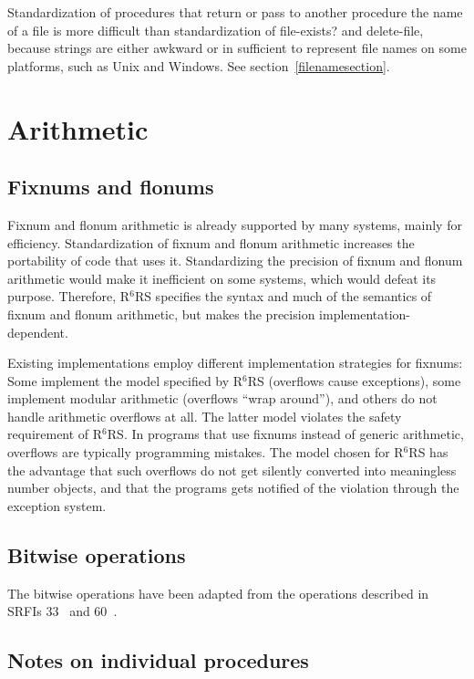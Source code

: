 \documentclass[twoside,twocolumn]{algol60}
\newcommand{\rn}[1]{R$^{#1}$RS}
\begin{document}
Standardization of procedures that return or pass to another procedure
the name of a file is more difficult than standardization of {\cf
  file-exists?} and {\cf delete-file}, because strings are either
awkward or in sufficient to represent file names on some platforms,
such as Unix and Windows.  See section~\ref{filenamesection}.

\chapter{Arithmetic}

\section{Fixnums and flonums}

Fixnum and flonum arithmetic is already supported by many systems,
mainly for efficiency. Standardization of fixnum and flonum arithmetic
increases the portability of code that uses it.  Standardizing the
precision of fixnum and flonum arithmetic would make it inefficient on
some systems, which would defeat its purpose.  Therefore, \rn{6}
specifies the syntax and much of the semantics of fixnum and flonum
arithmetic, but makes the precision implementation-dependent.

Existing implementations employ different implementation strategies
for fixnums: Some implement the model specified by \rn{6} (overflows
cause exceptions), some implement modular arithmetic (overflows ``wrap
around''), and others do not handle arithmetic overflows at all.  The
latter model violates the safety requirement of \rn{6}.  In programs
that use fixnums instead of generic arithmetic, overflows are
typically programming mistakes.  The model chosen for \rn{6} has the
advantage that such overflows do not get silently converted into
meaningless number objects, and that the programs gets notified of the
violation through the exception system.

\section{Bitwise operations}

The bitwise operations have been adapted from the operations described
in SRFIs 33~\cite{srfi33} and 60~\cite{srfi60}.

\section{Notes on individual procedures}
\end{document}
